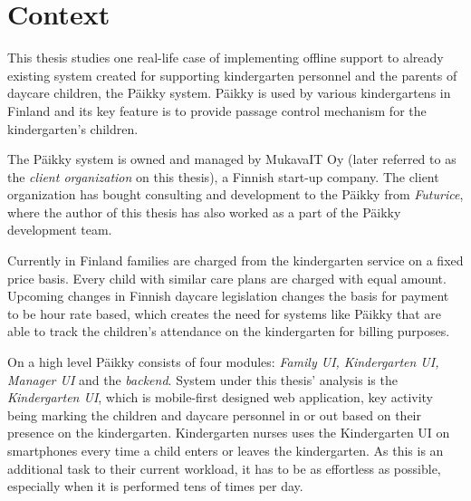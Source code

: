 



\section{Context}
This thesis studies one real-life case of implementing offline support to already existing system created for supporting kindergarten personnel and the parents of daycare children, the Päikky system. Päikky is used by various kindergartens in Finland and its key feature is to provide passage control mechanism for the kindergarten's children.

The Päikky system is owned and managed by MukavaIT Oy (later referred to as the \textit{client organization} on this thesis), a Finnish start-up company. The client organization has bought consulting and development to the Päikky from \textit{Futurice}, where the author of this thesis has also worked as a part of the Päikky development team.

Currently in Finland families are charged from the kindergarten service on a fixed price basis. Every child with similar care plans are charged with equal amount. Upcoming changes in Finnish daycare legislation changes the basis for payment to be hour rate based, which creates the need for systems like Päikky that are able to track the children's attendance on the kindergarten for billing purposes. %

On a high level Päikky consists of four modules: \textit{Family UI, Kindergarten UI, Manager UI} and the \textit{backend}. System under this thesis' analysis is the \textit{Kindergarten UI}, which is mobile-first designed web application, key activity being marking the children and daycare personnel in or out based on their presence on the kindergarten. Kindergarten nurses uses the Kindergarten UI on smartphones every time a child enters or leaves the kindergarten. As this is an additional task to their current workload, it has to be as effortless as possible, especially when it is performed tens of times per day. %

